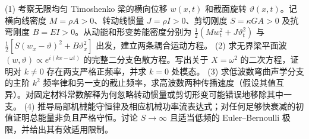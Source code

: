 (1) 考察无限均匀 Timoshenko 梁的横向位移 \(w(x,t)\) 和截面旋转 \(\vartheta(x,t)\)。记横向线密度 \(M=\rho A>0\)、转动线惯量 \(J=\rho I>0\)、剪切刚度 \(S=\kappa GA>0\) 及抗弯刚度 \(B=EI>0\)。从动能和形变势能密度分别为 \(\frac12(Mw_t^2+J\vartheta_t^2)\) 与 \(\frac12[S(w_x-\vartheta)^2+B\vartheta_x^2]\) 出发，建立两条耦合运动方程。
(2) 求无界梁平面波 \((w,\vartheta)\propto e^{i(kx-\omega t)}\) 的完整二分支色散方程。写出关于 \(X=\omega^2\) 的二次方程，证明对 \(k\ne0\) 存在两支严格正频率，并求 \(k=0\) 处模态。
(3) 求低波数弯曲声学分支的主阶 \(k^2\) 频率律和另一支的截止频率，求高波数两种传播速度（假设其值互异）。对固定材料常数解释为何忽略转动惯量或剪切形变可能错误地移除其中一支。
(4) 推导局部机械能守恒律及相应机械功率流表达式；对任何足够快衰减的初值证明总能量非负且严格守恒。讨论 \(S\to\infty\) 且适当低频的 Euler--Bernoulli 极限，并给出其有效适用限制。
